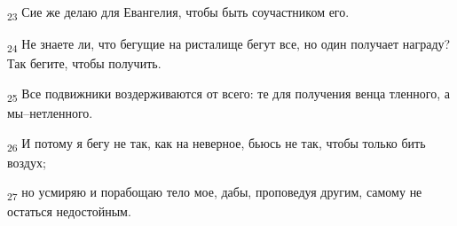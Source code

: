 \begin{tcolorbox}
\textsubscript{23} Сие же делаю для Евангелия, чтобы быть соучастником его.
\end{tcolorbox}
\begin{tcolorbox}
\textsubscript{24} Не знаете ли, что бегущие на ристалище бегут все, но один получает награду? Так бегите, чтобы получить.
\end{tcolorbox}
\begin{tcolorbox}
\textsubscript{25} Все подвижники воздерживаются от всего: те для получения венца тленного, а мы--нетленного.
\end{tcolorbox}
\begin{tcolorbox}
\textsubscript{26} И потому я бегу не так, как на неверное, бьюсь не так, чтобы только бить воздух;
\end{tcolorbox}
\begin{tcolorbox}
\textsubscript{27} но усмиряю и порабощаю тело мое, дабы, проповедуя другим, самому не остаться недостойным.
\end{tcolorbox}
